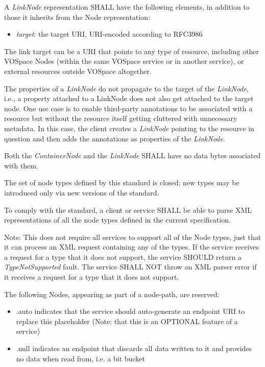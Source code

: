 \documentclass[11pt,a4paper]{ivoa}
\begin{document}
A \emph{LinkNode} representation SHALL have the following elements, in addition to those it inherits from the Node representation:

\begin{itemize}
    \item \emph{target}: the target URI, URI-encoded according to RFC3986 \citep{std:RFC3986}
\end{itemize}

The link target can be a URI that points to any type of resource, including other VOSpace Nodes (within the same VOSpace service or in another service), or external resources outside VOSpace altogether.

The properties of a \emph{LinkNode} do not propagate to the target of the \emph{LinkNode}, i.e., a property attached to a LinkNode does not also get attached to the target node. One use case is to enable third-party annotations to be associated with a resource but without the resource itself getting cluttered with unnecessary metadata. In this case, the client creates a \emph{LinkNode} pointing to the resource in question and then adds the annotations as properties of the \emph{LinkNode}.

Both the \emph{ContainerNode} and the \emph{LinkNode} SHALL have no data bytes associated with them.

The set of node types defined by this standard is closed; new types may be introduced only via new versions of the standard.

To comply with the standard, a client or service SHALL be able to parse XML representations of all the node types defined in the current specification.

Note: This does not require all services to support all of the Node types, just that it can process an XML request containing any of the types. If the service receives a request for a type that it does not support, the service SHOULD return a \emph{TypeNotSupported} fault. The service SHALL NOT throw an XML parser error if it receives a request for a type that it does not support.

The following Nodes, appearing as part of a node-path, are reserved:

\begin{itemize}
    \item .auto indicates that the service should auto-generate an endpoint URI to replace this placeholder (Note: that this is an OPTIONAL feature of a service)
    \item .null indicates an endpoint that discards all data written to it and provides no data when read from, i.e. a bit bucket
\end{itemize}
\end{document}
